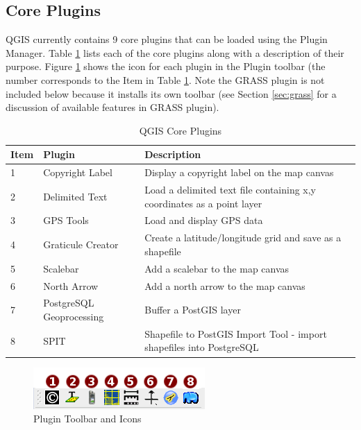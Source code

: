 \documentclass[10pt,english]{article}
\begin{document}
\begin{onehalfspace}
\subsection{Core Plugins}
QGIS currently contains 9 core plugins that can be loaded using the Plugin Manager. Table \ref{tab:core_plugins} lists each of the core plugins along with a description of their purpose. Figure \ref{fig:plugintoolbar} shows the icon for each plugin in the Plugin toolbar (the number corresponds to the Item in Table \ref{tab:core_plugins}. Note the GRASS plugin is not included below because it installs its own toolbar (see Section \ref{sec:grass} for a discussion of available features in GRASS plugin).
\begin{table}[h]
\centering
\caption{QGIS Core Plugins}\label{tab:core_plugins}\medskip
\small
 \begin{tabular}{|l|l|p{4in}|}
\hline \textbf{Item} & \textbf{Plugin} & \textbf{Description} \\
\hline 1 & Copyright Label \index{plugins!copyright}& Display a copyright label on the map canvas\\
\hline 2 & Delimited Text \index{plugins!delimited text}& Load a delimited text file containing x,y coordinates as a point layer \\
\hline 3 & GPS Tools \index{plugins!gps}& Load and display GPS data \\
\hline 4 & Graticule Creator \index{plugins!graticule}& Create a latitude/longitude grid and save as a shapefile\\
\hline 5 & Scalebar \index{plugins!scalebar}& Add a scalebar to the map canvas\\
\hline 6 & North Arrow \index{plugins!north arrow}& Add a north arrow to the map canvas\\
\hline 7 & PostgreSQL Geoprocessing \index{plugins!geoprocessing}& Buffer a PostGIS layer \\
\hline 8 & SPIT \index{plugins!SPIT}& Shapefile to PostGIS Import Tool - import shapefiles into PostgreSQL\\
\hline
\end{tabular}
\end{table}
\normalsize
\begin{figure}[h]
   \begin{center}
   \caption{Plugin Toolbar and Icons}\label{fig:plugintoolbar}\smallskip
   \includegraphics[scale=1.0]{qgis_user_guide_images/plugintoolbar}
\end{center}  
\end{figure}
\clearpage
\appendix

\end{onehalfspace}
\end{document}
